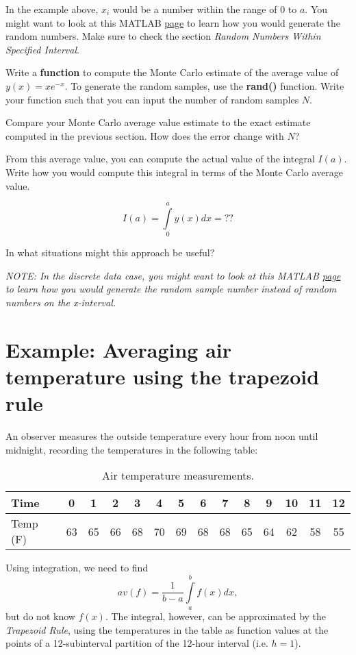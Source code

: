 \documentclass[10pt,fleqn]{article}
\begin{document}
In the example above, $x_i$ would be a number within the range of 0 to $a$. You might want to look at this MATLAB \href{https://www.mathworks.com/help/matlab/ref/rand.html}{page} to learn how you would generate the random numbers. Make sure to check the section \textit{Random Numbers Within Specified Interval}.

Write a \textbf{function} to compute the Monte Carlo estimate of the average value of $y(x)=xe^{-x}$. To generate the random samples, use the \textbf{rand()} function. Write your function such that you can input the number of random samples $N$.

Compare your Monte Carlo average value estimate to the exact estimate computed in the previous section. How does the error change with $N$?

From this average value, you can compute the actual value of the integral $I(a)$. Write how you would compute this integral in terms of the Monte Carlo average value.

$$I(a) = \int\limits_0^a y(x) dx = ??$$

In what situations might this approach be useful?

\textit{NOTE: In the discrete data case, you might want to look at this MATLAB \href{https://www.mathworks.com/help/matlab/math/random-integers.html}{page} to learn how you would generate the random sample number instead of random numbers on the x-interval.}

\section*{Example: Averaging air temperature using the trapezoid rule}

An observer measures the outside temperature every hour from noon until midnight, recording the temperatures in the following table:

\begin{table}[bh]
	\centering
	\begin{tabular}{l|ccccccccccccc} \hline
	Time & 0 & 1 & 2 & 3 & 4 & 5 & 6 & 7 & 8 & 9 & 10 & 11 & 12 \\ \hline
	Temp (F) & 63 & 65 & 66 & 68 & 70 & 69 & 68 & 68 & 65 & 64 & 62 & 58 & 55 \\ \hline
	\end{tabular}
	\caption{Air temperature measurements.}
	\label{tab:airtemp}
\end{table}

Using integration, we need to find $$av(f) = \frac{1}{b-a} \int \limits_a^b f(x) dx,$$ but do not know $f(x)$. The integral, however, can be approximated by the \textit{Trapezoid Rule}, using the temperatures in the table as function values at the points of a 12-subinterval partition of the 12-hour interval (i.e. $h=1$).
\end{document}
